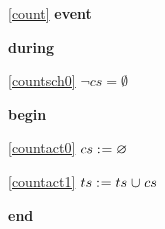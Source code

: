 \noindent \ref{count}  \textbf{event}
\begin{block}
  \item   \textbf{during}
  \begin{block}
  \item[ \eqref{countsch0} ]$\neg cs = \emptyset $ %
  \end{block}
  \item   \textbf{begin}
  \begin{block}
  \item[ \eqref{countact0} ]$cs \mathrel{:\mkern1mu=} \mathord\varnothing$ %
  \item[ \eqref{countact1} ]$ts \mathrel{:\mkern1mu=} ts \mathbin{\mkern1mu\cup\mkern1mu} cs $ %
  \end{block}
  \item   \textbf{end} \\
\end{block}
